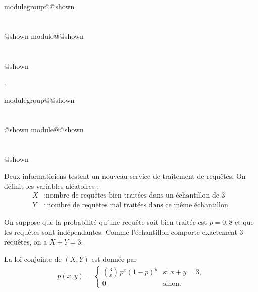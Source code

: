 \documentclass{Evaluation}
\makeatletter
\newcommand{\currentmodulekey}{}
\newcommand{\currentmoduletitle}{}
\newcommand{\currentgroupkey}{}
\newcommand{\currentgrouptitle}{}
\newcommand{\showmoduleifneeded}{%
  \ifx\currentgroupkey\empty\else
    \expandafter\ifx\csname modulegroup@\currentgroupkey @shown\endcsname\relax
      \section*{\currentgrouptitle}%
      \expandafter\gdef\csname modulegroup@\currentgroupkey @shown\endcsname{1}%
    \fi
  \fi
  \expandafter\ifx\csname module@\currentmodulekey @shown\endcsname\relax
    \section*{\currentmoduletitle}%
    \expandafter\gdef\csname module@\currentmodulekey @shown\endcsname{1}%
  \fi
}
\newenvironment{A23}{\showmoduleifneeded}{}
\newenvironment{A25}{\showmoduleifneeded}{}
\makeatother
\begin{document}
\begin{questions}
\begin{A23}
 .
\end{A23}

\begin{A25}
\question {} %
\label{A25-F5-loiconjoite} 
Deux informaticiens testent un nouveau service de traitement de requêtes.  
On définit les variables aléatoires :
\begin{align*}
X&: \text{nombre de requêtes bien traitées dans un échantillon de 3}\\
Y&: \text{nombre de requêtes mal traitées dans ce même échantillon}.
\end{align*}

On suppose que la probabilité qu’une requête soit bien traitée est $p=0,8$ et que les requêtes sont indépendantes.  
Comme l’échantillon comporte exactement 3 requêtes, on a $X+Y=3$.

La loi conjointe de $(X,Y)$ est donnée par
\begin{align*}
p(x,y) = 
\begin{cases}
\displaystyle\binom{3}{x} \, p^x (1-p)^y & \text{si } x+y=3,\\[8pt]
0 & \text{sinon.}
\end{cases}
\end{align*}


\end{A25}
\end{questions}
\end{document}

